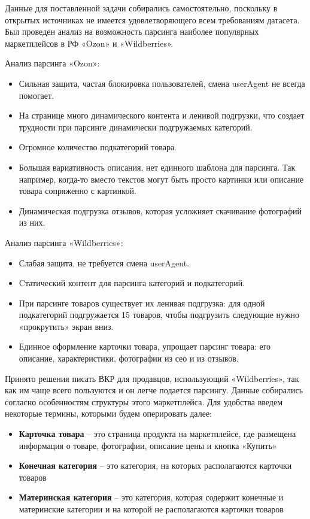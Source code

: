 \documentclass[a4paper,12pt]{extarticle}
\begin{document}
Данные для поставленной задачи собирались самостоятельно, поскольку в открытых источниках не имеется удовлетворяющего всем требованиям датасета. Был проведен анализ на возможность парсинга наиболее популярных маркетплейсов в РФ «Ozon» и «Wildberries».

Анализ парсинга «Ozon»:
\begin{itemize}
\item Сильная защита, частая блокировка пользователей, смена userAgent не всегда помогает.
\item На странице много динамического контента и ленивой подгрузки, что создает трудности при парсинге динамически подгружаемых категорий.
\item Огромное количество подкатегорий товара.
\item Большая вариативность описания, нет единного шаблона для парсинга. Так например, когда-то вместо текстов могут быть просто картинки или описание товара сопряженно с картинкой.
\item Динамическая подгрузка отзывов, которая усложняет скачивание фотографий из них.
\end{itemize}

Анализ парсинга «Wildberries»:
\begin{itemize}
	\item Слабая защита, не требуется смена userAgent.
	\item Cтатический контент для парсинга категорий и подкатегорий.
	\item При парсинге товаров существует их ленивая подгрузка: для одной подкатегорий подгружается 15 товаров, чтобы подгрузить следующие нужно «прокрутить» экран вниз.
	\item Единное оформление карточки товара, упрощает парсинг товара: его описание, характеристики, фотографии из сео и из отзывов.
\end{itemize}

Принято решения писать ВКР для продавцов, использующий «Wildberries», так как им чаще всего пользуются и он легче подается парсингу. Данные собирались согласно особенностям структуры этого маркетплейса. Для удобства введем некоторые термины, которыми будем оперировать далее:
\begin{itemize}
	\item \textbf{Карточка товара} – это страница продукта на маркетплейсе, где размещена информация о товаре, фотографии, описание цены и кнопка «Купить»
	\item \textbf{Конечная категория} – это категория, на которых располагаются карточки товаров
	\item \textbf{Материнская категория} – это категория, которая содержит конечные и материнские категории и на которой не располагаются карточки товаров
\end{itemize}
\end{document}
